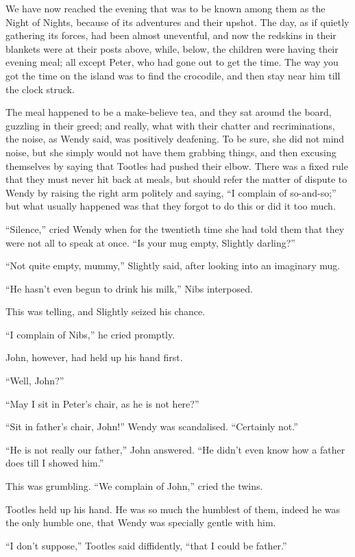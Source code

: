We have now reached the evening that was to be known among them as the
Night of Nights, because of its adventures and their upshot. The day,
as if quietly gathering its forces, had been almost uneventful, and now
the redskins in their blankets were at their posts above, while, below,
the children were having their evening meal; all except Peter, who had
gone out to get the time. The way you got the time on the island was to
find the crocodile, and then stay near him till the clock struck.

The meal happened to be a make-believe tea, and they sat around the
board, guzzling in their greed; and really, what with their chatter and
recriminations, the noise, as Wendy said, was positively deafening. To
be sure, she did not mind noise, but she simply would not have them
grabbing things, and then excusing themselves by saying that Tootles
had pushed their elbow. There was a fixed rule that they must never hit
back at meals, but should refer the matter of dispute to Wendy by
raising the right arm politely and saying, ``I complain of so-and-so;''
but what usually happened was that they forgot to do this or did it too
much.

``Silence,'' cried Wendy when for the twentieth time she had told them
that they were not all to speak at once. ``Is your mug empty, Slightly
darling?''

``Not quite empty, mummy,'' Slightly said, after looking into an
imaginary mug.

``He hasn't even begun to drink his milk,'' Nibs interposed.

This was telling, and Slightly seized his chance.

``I complain of Nibs,'' he cried promptly.

John, however, had held up his hand first.

``Well, John?''

``May I sit in Peter's chair, as he is not here?''

``Sit in father's chair, John!'' Wendy was scandalised. ``Certainly not.''

``He is not really our father,'' John answered. ``He didn't even know how
a father does till I showed him.''

This was grumbling. ``We complain of John,'' cried the twins.

Tootles held up his hand. He was so much the humblest of them, indeed
he was the only humble one, that Wendy was specially gentle with him.

``I don't suppose,'' Tootles said diffidently, ``that I could be father.''


